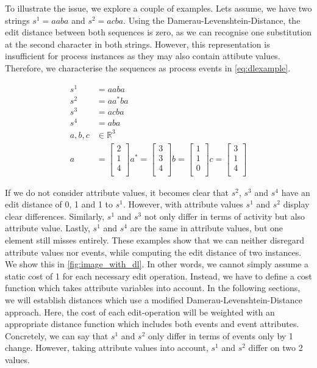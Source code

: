 \documentclass[./../../paper.tex]{subfiles}
\begin{document}
To illustrate the issue, we explore a couple of examples. Lets assume, we have two strings $s^1=aaba$ and $s^2=acba$. Using the Damerau-Levenshtein-Distance, the edit distance between both sequences is zero, as we can recognise one substitution at the second character in both strings. However, this representation is insufficient for process instances as they may also contain attibute values. Therefore, we characterise the sequences as process events in \autoref{eq:dlexample}. 

\begin{align}
    \label{eq:dlexample}
    s^1 &=aaba \\
    s^2 &=aa^*ba\\
    s^3 &=acba\\
    s^4 &=aba\\
    a,b,c &\in \mathbb{R}^3 \\
    a &= \begin{bmatrix}
        2\\
        1\\
        4\\
    \end{bmatrix}
    a^* = \begin{bmatrix}
        3\\
        3\\
        4\\
    \end{bmatrix}
    b = \begin{bmatrix}
        1\\
        1\\
        0\\
    \end{bmatrix}
    c = \begin{bmatrix}
        3\\
        1\\
        4\\
    \end{bmatrix}
\end{align}

\noindent If we do not consider attribute values, it becomes clear that $s^2$, $s^3$ and $s^4$ have an edit distance of 0, 1 and 1 to $s^1$. However, with attribute values $s^1$ and $s^2$ display clear differences. Similarly, $s^1$ and $s^3$ not only differ in terms of activity but also attribute value. Lastly, $s^1$ and $s^4$ are the same in attribute values, but one element still misses entirely. These examples show that we can neither disregard attribute values nor events, while computing the edit distance of two \glspl{instance}. We show this in \autoref{fig:image_with_dl}. In other words, we cannot simply assume a static cost of 1 for each necessary edit operation. Instead, we have to define a cost function which takes attribute variables into account. In the following sections, we will establish distances which use a modified Damerau-Levenshtein-Distance approach. Here, the cost of each edit-operation will be weighted with an appropriate distance function which includes both events and event attributes. Concretely, we can say that $s^1$ and $s^2$ only differ in terms of events only by 1 change. However, taking attribute values into account, $s^1$ and $s^2$ differ on two 2 values. 
\end{document}
